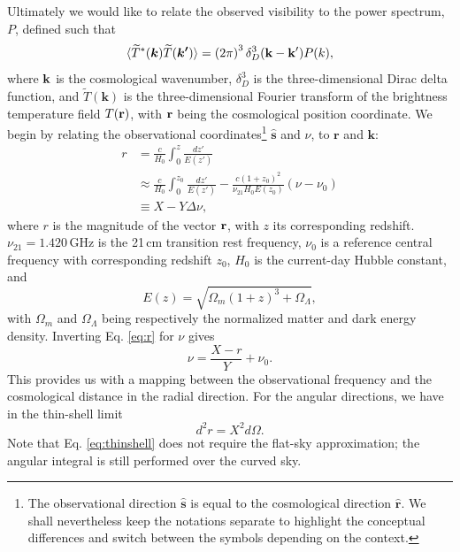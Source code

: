 \documentclass[twocolumn,apj,numberedappendix]{emulateapj}
\renewcommand\[{\begin{equation}}
\renewcommand\]{\end{equation}}
\begin{document}



Ultimately we would like to relate the observed visibility to the power spectrum, $P$, defined such that
\[
\langle \widetilde{T}^{*}(\boldsymbol{k})\widetilde{T}(\boldsymbol{k'})\rangle = \left(2\pi\right)^3\delta_D^3(\bold{k}-\bold{k'})P(k),
\label{eq:Pofk}
\]
where $\bold{k}$ is the cosmological wavenumber, $\delta_D^3$ is the three-dimensional Dirac delta function, and $\widetilde{T}(\boldsymbol{k})$ is the three-dimensional Fourier transform of the brightness temperature field $T(\bold{r})$, with $\bold r$ being the cosmological position coordinate. 
We begin by relating the observational coordinates\footnote{The observational direction $\hat{\boldsymbol{s}}$ is equal to the cosmological direction $\hat{\boldsymbol{r}}$. We shall nevertheless keep the notations separate to highlight the conceptual differences and switch between the symbols depending on the context. } $\hat{\boldsymbol{s}}$
and $\nu$, to
$\boldsymbol{r}$ and $\boldsymbol{k}$: 
\[
\begin{aligned}r & =\frac{c}{H_{0}}\int_{0}^{z}\frac{dz'}{E(z')}\\
 & \approx\frac{c}{H_{0}}\int_{0}^{z_{0}}\frac{dz'}{E(z')}-\frac{c(1+z_0)^{2}}{\nu_{21}H_{0}E(z_0)}\left(\nu-\nu_{0}\right)\\
 & \equiv X-Y\Delta\nu,
\end{aligned} \label{eq:r}
\]
where $r$ is the magnitude of the vector $\bold{r}$, with $z$ its corresponding redshift. $\nu_{21}=1.420$\,GHz is the 21\,cm transition rest frequency, $\nu_{0}$ is
a reference central frequency with corresponding redshift $z_{0}$, $H_0$ is the current-day Hubble constant,  
and 
\[
E(z)=\sqrt{\Omega_{m}(1+z)^{3}+\Omega_{\Lambda}},
\]
with $\Omega_{m}$ and $\Omega_{\Lambda}$ being respectively the normalized matter and dark energy density. Inverting Eq. \eqref{eq:r} for $\nu$ gives
\begin{equation}
\nu=\frac{X-r}{Y}+\nu_{0}.\label{eq:nur}
\end{equation}
This provides us with a mapping between the observational frequency and the cosmological distance in the radial direction. For the angular directions, we have in the thin-shell limit
\begin{equation}
d^2r=X^2d\Omega. 
\label{eq:thinshell}
\end{equation}
Note that Eq. \eqref{eq:thinshell} does not require the flat-sky approximation; the angular integral is still performed over the curved sky. 
\end{document}

